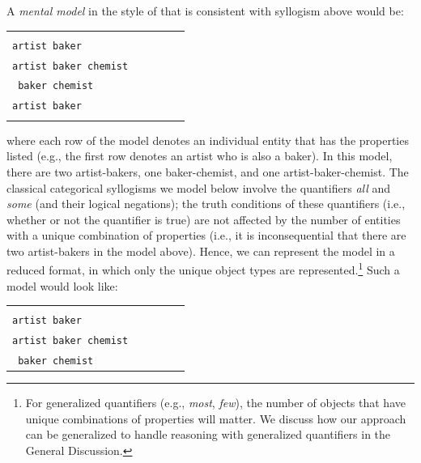 \documentclass[floatsintext, doc]{apa6}
\begin{document}
A \emph{mental model} in the style of   that is consistent with syllogism above would be:

\begin{tabularx}{.8\textwidth}{XXXXX}
& \\
\tt artist baker \\
\tt artist baker chemist \\
\tt \hspace{1.23cm} baker chemist \\
\tt artist baker \\
& \\
\end{tabularx}

\noindent where each row of the model denotes an individual entity that has the properties listed (e.g., the first row denotes an artist who is also a baker).
In this model, there are two artist-bakers, one baker-chemist, and one artist-baker-chemist.
The classical categorical syllogisms we model below involve the quantifiers \emph{all} and \emph{some} (and their logical negations); the truth conditions of these quantifiers (i.e., whether or not the quantifier is true) are not affected by the number of entities with a unique combination of properties (i.e., it is inconsequential that there are two artist-bakers in the model above).
Hence, we can represent the model in a reduced format, in which only the unique object types are represented.\footnote{
For generalized quantifiers (e.g., \emph{most}, \emph{few}), the number of objects that have unique combinations of properties will matter. We discuss how our approach can be generalized to handle reasoning with generalized quantifiers in the General Discussion.}
Such a model would look like: 

\begin{tabularx}{.8\textwidth}{XXXXX}
& \\
\tt artist baker \\
\tt artist baker chemist \\
\tt \hspace{1.23cm} baker chemist 
& \\
\end{tabularx}
\end{document}
